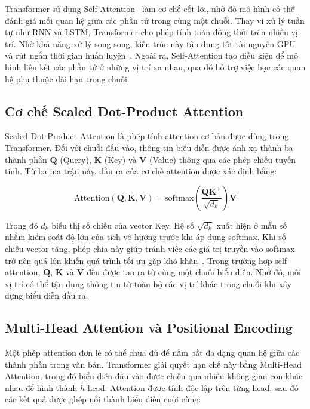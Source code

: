 Transformer sử dụng Self-Attention~\cite{vaswani2017attention} làm cơ chế cốt lõi, nhờ đó mô hình có thể đánh giá mối quan hệ giữa các phần tử trong cùng một chuỗi. Thay vì xử lý tuần tự như RNN và LSTM, Transformer cho phép tính toán đồng thời trên nhiều vị trí. Nhờ khả năng xử lý song song, kiến trúc này tận dụng tốt tài nguyên GPU và rút ngắn thời gian huấn luyện~\cite{lin2022survey}. Ngoài ra, Self-Attention tạo điều kiện để mô hình liên kết các phần tử ở những vị trí xa nhau, qua đó hỗ trợ việc học các quan hệ phụ thuộc dài hạn trong chuỗi.

\subsection{Cơ chế Scaled Dot-Product Attention}

Scaled Dot-Product Attention là phép tính attention cơ bản được dùng trong Transformer. Đối với chuỗi đầu vào, thông tin biểu diễn được ánh xạ thành ba thành phần $\mathbf{Q}$ (Query), $\mathbf{K}$ (Key) và $\mathbf{V}$ (Value) thông qua các phép chiếu tuyến tính. Từ ba ma trận này, đầu ra của cơ chế attention được xác định bằng:

\begin{equation}
    \mathrm{Attention}(\mathbf{Q}, \mathbf{K}, \mathbf{V})
    =
    \mathrm{softmax}\!\left(
    \frac{\mathbf{Q}\mathbf{K}^\top}{\sqrt{d_k}}
    \right)\mathbf{V}
    \label{eq:attention}
\end{equation}

Trong đó $d_k$ biểu thị số chiều của vector Key. Hệ số $\sqrt{d_k}$ xuất hiện ở mẫu số nhằm kiểm soát độ lớn của tích vô hướng trước khi áp dụng softmax. Khi số chiều vector tăng, phép chia này giúp tránh việc các giá trị truyền vào softmax trở nên quá lớn khiến quá trình tối ưu gặp khó khăn~\cite{vaswani2017attention}. Trong trường hợp self-attention, $\mathbf{Q}$, $\mathbf{K}$ và $\mathbf{V}$ đều được tạo ra từ cùng một chuỗi biểu diễn. Nhờ đó, mỗi vị trí có thể tận dụng thông tin từ toàn bộ các vị trí khác trong chuỗi khi xây dựng biểu diễn đầu ra.

\subsection{Multi-Head Attention và Positional Encoding}

Một phép attention đơn lẻ có thể chưa đủ để nắm bắt đa dạng quan hệ giữa các thành phần trong văn bản. Transformer giải quyết hạn chế này bằng Multi-Head Attention, trong đó biểu diễn đầu vào được chiếu qua nhiều không gian con khác nhau để hình thành $h$ head. Attention được tính độc lập trên từng head, sau đó các kết quả được ghép nối thành biểu diễn cuối cùng:

